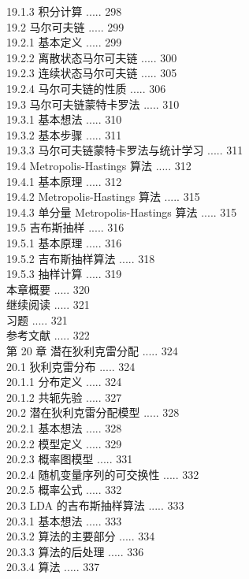 \documentclass[10pt]{article}
\begin{document}
\begin{CJK*}{UTF8}{bsmi}
19.1.3 积分计算 ..... 298\\
19.2 马尔可夫链 ..... 299\\
19.2.1 基本定义 ..... 299\\
19.2.2 离散状态马尔可夫链 ..... 300\\
19.2.3 连续状态马尔可夫链 ..... 305\\
19.2.4 马尔可夫链的性质 ..... 306\\
19.3 马尔可夫链蒙特卡罗法 ..... 310\\
19.3.1 基本想法 ..... 310\\
19.3.2 基本步骤 ..... 311\\
19.3.3 马尔可夫链蒙特卡罗法与统计学习 ..... 311\\
19.4 Metropolis-Hastings 算法 ..... 312\\
19.4.1 基本原理 ..... 312\\
19.4.2 Metropolis-Hastings 算法 ..... 315\\
19.4.3 单分量 Metropolis-Hastings 算法 ..... 315\\
19.5 吉布斯抽样 ..... 316\\
19.5.1 基本原理 ..... 316\\
19.5.2 吉布斯抽样算法 ..... 318\\
19.5.3 抽样计算 ..... 319\\
本章概要 ..... 320\\
继续阅读 ..... 321\\
习题 ..... 321\\
参考文献 ..... 322\\
第 20 章 潜在狄利克雷分配 ..... 324\\
20.1 狄利克雷分布 ..... 324\\
20.1.1 分布定义 ..... 324\\
20.1.2 共轭先验 ..... 327\\
20.2 潜在狄利克雷分配模型 ..... 328\\
20.2.1 基本想法 ..... 328\\
20.2.2 模型定义 ..... 329\\
20.2.3 概率图模型 ..... 331\\
20.2.4 随机变量序列的可交换性 ..... 332\\
20.2.5 概率公式 ..... 332\\
20.3 LDA 的吉布斯抽样算法 ..... 333\\
20.3.1 基本想法 ..... 333\\
20.3.2 算法的主要部分 ..... 334\\
20.3.3 算法的后处理 ..... 336\\
20.3.4 算法 ..... 337\\

\end{CJK*}
\end{document}
